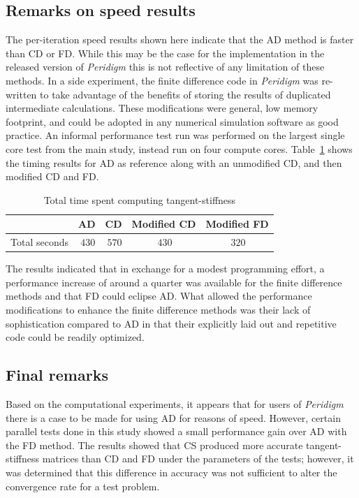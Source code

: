 \documentclass[preprint,12pt]{elsarticle}
\begin{document}
\subsection{Remarks on speed results}
%
The per-iteration speed results shown here indicate that the AD method is faster than CD or FD.  While this may be the case for the implementation in the released version of \emph{Peridigm} this is not reflective of any limitation of these methods. In a side experiment, the finite difference code in \emph{Peridigm} was re-written to take advantage of the benefits of storing the results of duplicated intermediate calculations. These modifications were general, low memory footprint, and could be adopted in any numerical simulation software as good practice. An informal performance test run was performed on the largest single core test from the main study, instead run on four compute cores. Table~\ref{tab:PerformanceMod} shows the timing results for AD as reference along with an unmodified CD, and then modified CD and FD.
%
\begin{table}[tbp]   
\centering 
\caption{Total time spent computing tangent-stiffness} 
\label{tab:PerformanceMod}   
\begin{tabular}{c c c c c}
\toprule & AD & CD & Modified CD & Modified FD\\
\midrule  Total seconds & $~430$ & $~570$ & $~430$ &$~320$ \\ 
\bottomrule 
\end{tabular} 
\end{table}

The results indicated that in exchange for a modest programming effort, a performance increase of around a quarter was available for the finite difference methods and that FD could eclipse AD. What allowed the performance modifications to enhance the finite difference methods was their lack of sophistication compared to AD in that their explicitly laid out and repetitive code could be readily optimized. 

\subsection{Final remarks}
%
Based on the computational experiments, it appears that for users of \emph{Peridigm} there is a case to be made for using AD for reasons of speed. However, certain parallel tests done in this study showed a small performance gain over AD with the FD method.  The results showed that CS produced more accurate tangent-stiffness matrices than CD and FD under the parameters of the tests; however, it was determined that this difference in accuracy was not sufficient to alter the convergence rate for a test problem.  
\end{document}
